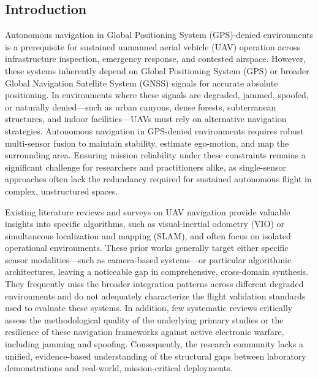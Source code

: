 \documentclass[conference]{IEEEtran}
\begin{document}








\subsection{Introduction}


Autonomous navigation in Global Positioning System (GPS)-denied environments is a prerequisite for sustained unmanned aerial vehicle (UAV) operation across infrastructure inspection, emergency response, and contested airspace. However, these systems inherently depend on Global Positioning System (GPS) or broader Global Navigation Satellite System (GNSS) signals for accurate absolute positioning. In environments where these signals are degraded, jammed, spoofed, or naturally denied—such as urban canyons, dense forests, subterranean structures, and indoor facilities—UAVs must rely on alternative navigation strategies. Autonomous navigation in GPS-denied environments requires robust multi-sensor fusion to maintain stability, estimate ego-motion, and map the surrounding area. Ensuring mission reliability under these constraints remains a significant challenge for researchers and practitioners alike, as single-sensor approaches often lack the redundancy required for sustained autonomous flight in complex, unstructured spaces.


Existing literature reviews and surveys on UAV navigation provide valuable insights into specific algorithms, such as visual-inertial odometry (VIO) or simultaneous localization and mapping (SLAM), and often focus on isolated operational environments. These prior works generally target either specific sensor modalities—such as camera-based systems—or particular algorithmic architectures, leaving a noticeable gap in comprehensive, cross-domain synthesis. They frequently miss the broader integration patterns across different degraded environments and do not adequately characterize the flight validation standards used to evaluate these systems. In addition, few systematic reviews critically assess the methodological quality of the underlying primary studies or the resilience of these navigation frameworks against active electronic warfare, including jamming and spoofing. Consequently, the research community lacks a unified, evidence-based understanding of the structural gaps between laboratory demonstrations and real-world, mission-critical deployments.
\end{document}
